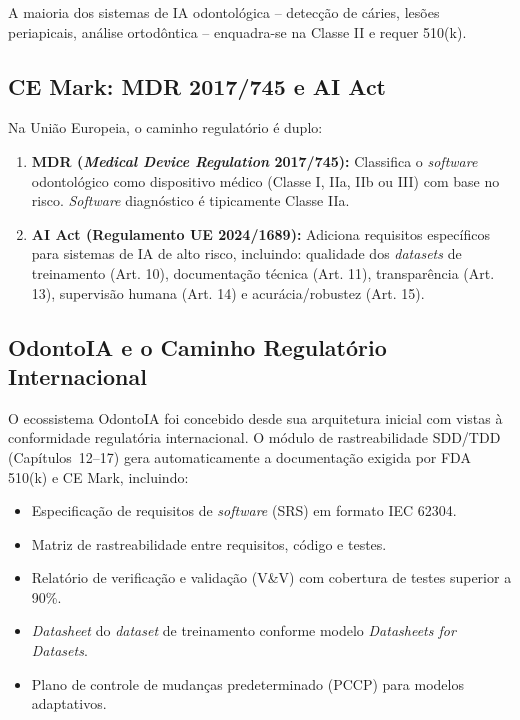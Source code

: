 A maioria dos sistemas de IA odontológica -- detecção de cáries, lesões
periapicais, análise ortodôntica -- enquadra-se na Classe II e requer 510(k).


\subsection{CE Mark: MDR 2017/745 e AI Act}

Na União Europeia, o caminho regulatório é duplo:

\begin{enumerate}
  \item \textbf{MDR (\textit{Medical Device Regulation} 2017/745):} Classifica
    o \textit{software} odontológico como dispositivo médico (Classe I, IIa, IIb
    ou III) com base no risco. \textit{Software} diagnóstico é tipicamente
    Classe IIa.

  \item \textbf{AI Act (Regulamento UE 2024/1689):} Adiciona requisitos
    específicos para sistemas de IA de alto risco, incluindo: qualidade dos
    \textit{datasets} de treinamento (Art. 10), documentação técnica (Art. 11),
    transparência (Art. 13), supervisão humana (Art. 14) e acurácia/robustez
    (Art. 15).
\end{enumerate}

\subsection{OdontoIA e o Caminho Regulatório Internacional}

O ecossistema OdontoIA foi concebido desde sua arquitetura inicial com vistas à
conformidade regulatória internacional. O módulo de rastreabilidade SDD/TDD
(Capítulos~12--17) gera automaticamente a documentação exigida por FDA 510(k) e
CE Mark, incluindo:

\begin{itemize}
  \item Especificação de requisitos de \textit{software} (SRS) em formato
    IEC 62304.
  \item Matriz de rastreabilidade entre requisitos, código e testes.
  \item Relatório de verificação e validação (V\&V) com cobertura de testes
    superior a 90\%.
  \item \textit{Datasheet} do \textit{dataset} de treinamento conforme modelo
    \textit{Datasheets for Datasets}.
  \item Plano de controle de mudanças predeterminado (PCCP) para modelos
    adaptativos.
\end{itemize}

